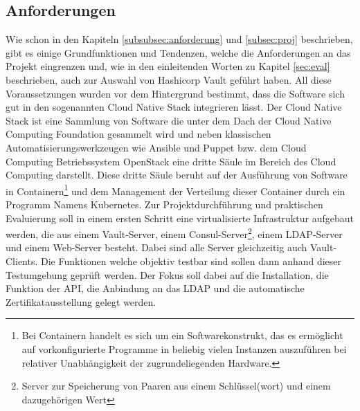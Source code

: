\documentclass[
book,
a4paper,   
titlepage,  
halfparskip,
12pt        
]{scrartcl}
\begin{document}
\begin{onehalfspacing}
\subsection{Anforderungen}
\label{subsec:anf}
Wie schon in den Kapiteln \vref{subsubsec:anforderung} und \vref{subsec:proj} beschrieben, gibt es einige Grundfunktionen und Tendenzen, welche die Anforderungen an das Projekt eingrenzen und, wie in den einleitenden Worten zu Kapitel \vref{sec:eval} beschrieben, auch zur Auswahl von Hashicorp Vault geführt haben. All diese Voraussetzungen wurden vor dem Hintergrund bestimmt, dass die Software sich gut in den sogenannten Cloud Native Stack integrieren lässt. Der Cloud Native Stack ist eine Sammlung von Software die unter dem Dach der Cloud Native Computing Foundation gesammelt wird und neben klassischen Automatisierungswerkzeugen wie Ansible und Puppet bzw. dem Cloud Computing Betriebssystem OpenStack eine dritte Säule im Bereich des Cloud Computing darstellt. Diese dritte Säule beruht auf der Ausführung von Software in Containern\footnote{Bei Containern handelt es sich um ein Softwarekonstrukt, das es ermöglicht auf vorkonfigurierte Programme in beliebig vielen Instanzen auszuführen bei relativer Unabhängigkeit der zugrundeliegenden Hardware.} und dem Management der Verteilung dieser Container durch ein Programm Namens Kubernetes.\newline
Zur Projektdurchführung und praktischen Evaluierung soll in einem ersten Schritt eine virtualisierte Infrastruktur aufgebaut werden, die aus einem Vault-Server, einem Consul-Server\footnote{Server zur Speicherung von Paaren aus einem Schlüssel(wort) und einem dazugehörigen Wert}, einem \ac{LDAP}-Server und einem Web-Server besteht. Dabei sind alle Server gleichzeitig auch Vault-Clients. Die Funktionen welche objektiv testbar sind sollen dann anhand dieser Testumgebung geprüft werden. Der Fokus soll dabei auf die Installation, die Funktion der \ac{API}, die Anbindung an das \ac{LDAP} und die automatische Zertifikatausstellung gelegt werden.


\end{onehalfspacing}
\end{document}
